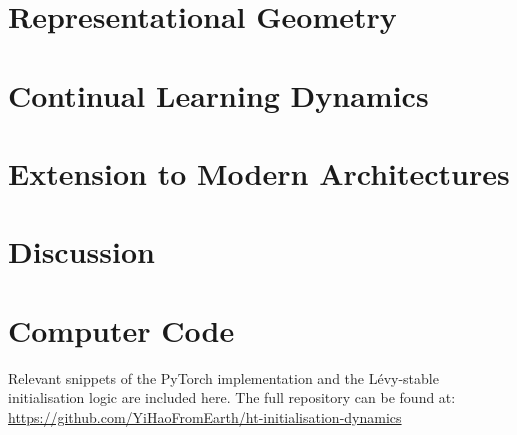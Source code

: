 \documentclass[11pt,oneside]{report}
\begin{document}
\chapter{Representational Geometry}
\label{chap:chap2}

\chapter{Continual Learning Dynamics}
\label{chap:chap3}

\chapter{Extension to Modern Architectures}
\label{chap:chap4}

\chapter{Discussion}
\label{chap:chap5}

\newpage
{}
\nocite{*}
\printbibliography[heading=bibintoc, title={References}]

\appendix
\chapter{Computer Code}
Relevant snippets of the PyTorch implementation and the Lévy-stable initialisation logic are included here. The full repository can be found at: \url{https://github.com/YiHaoFromEarth/ht-initialisation-dynamics}
\end{document}
